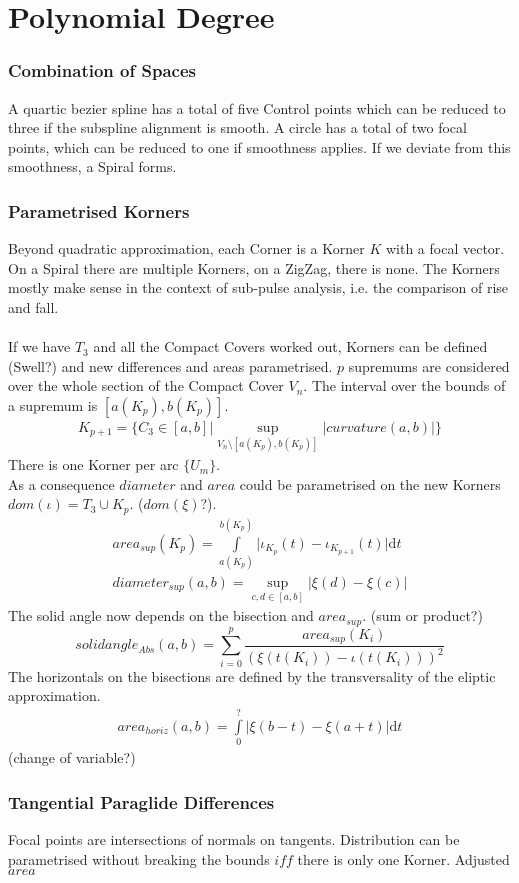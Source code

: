 \documentclass[a4paper,portrait]{report}
\begin{document}
\chapter{Polynomial Degree}
\subsection{Combination of Spaces}
A quartic bezier spline has a total of five Control points which can be reduced to three if the subspline alignment is smooth. A circle has a total of two focal points, which can be reduced to one if smoothness applies. If we deviate from this smoothness, a Spiral forms.
\subsection{Parametrised Korners}
Beyond quadratic approximation, each Corner is a Korner $K$ with a focal vector. On a Spiral there are multiple Korners, on a ZigZag, there is none. The Korners mostly make sense in the context of sub-pulse analysis, i.e. the comparison of rise and fall.\\\\
If we have $T_{3}$ and all the Compact Covers worked out, Korners can be defined (Swell?) and new differences and areas parametrised. $p$ supremums are considered over the whole section of the Compact Cover $V_{n}$. The interval over the bounds of a supremum is $[a(K_{p}),b(K_{p})]$.
\begin{align}
K_{p+1} = \{ C_{3} \in  [a,b]\vert \sup \limits _{V_{n} \setminus [a(K_{p}),b(K_{p})]} \lvert curvature(a,b) \rvert \}
\end{align}
There is one Korner per arc $\{U_{m}\}$.\\
As a consequence $diameter$ and $area$ could be parametrised on the new Korners $dom(\iota)=T_{3}\cup K_{p}$. ($dom(\xi)$?).\\
\begin{align}
area_{sup}(K_{p})=\int \limits _{a(K_{p})}^{b(K_{p})} \lvert \iota_{K_{p}}(t)-\iota_{K_{p+1}}(t) \rvert \mathrm{d}t\\
diameter_{sup}(a,b)=\sup \limits _{c,d \in [a,b]} \lvert \xi(d) - \xi(c) \rvert
\end{align}
The solid angle now depends on the bisection and $area_{sup}$. (sum or product?)
\begin{equation}
solidangle_{Abs}(a,b)=\sum \limits _{i=0}^{p} \frac{area_{sup}(K_{i})}{(\xi(t(K_{i}))-\iota(t(K_{i})))^2}
\end{equation}
The horizontals on the bisections are defined by the transversality of the eliptic approximation.
\begin{align}
area_{horiz}(a,b)=\int \limits _{0}^{?} \lvert \xi(b-t)-\xi(a+t) \rvert \mathrm{d}t
\end{align}
(change of variable?)
\subsection{Tangential Paraglide Differences}
Focal points are intersections of normals on tangents. Distribution can be parametrised without breaking the bounds $iff$ there is only one Korner. Adjusted $area$

\iffalse
\printbibliography
\fi
{}

\end{document}
